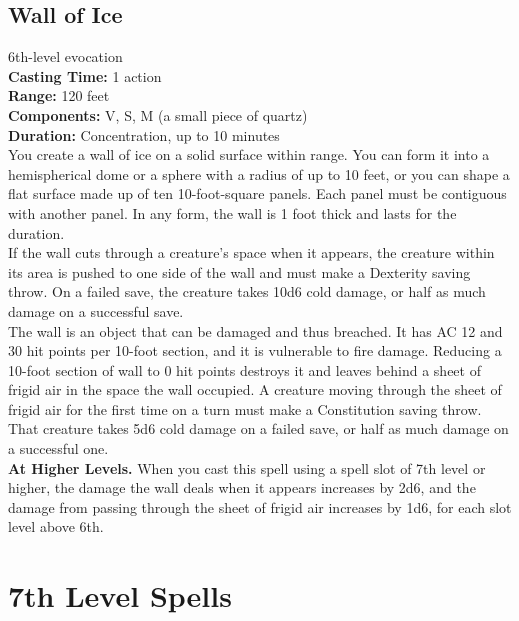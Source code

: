 \documentclass[11pt, A4paper, english]{article}
\begin{document}
		\subsection{Wall of Ice}
6th-level evocation \\
\textbf{Casting Time:} 1 action \\
\textbf{Range:} 120 feet \\
\textbf{Components:} V, S, M (a small piece of quartz) \\
\textbf{Duration:} Concentration, up to 10 minutes \\
You create a wall of ice on a solid surface within range. You can form it into a hemispherical dome or a sphere with a radius of up to 10 feet, or you can shape a flat surface made up of ten 10-foot-square panels. Each panel must be contiguous with another panel. In any form, the wall is 1 foot thick and lasts for the duration. \\
If the wall cuts through a creature’s space when it appears, the creature within its area is pushed to one side of the wall and must make a Dexterity saving throw. On a failed save, the creature takes  10d6 cold damage, or half as much damage on a successful save. \\
The wall is an object that can be damaged and thus breached. It has AC 12 and 30 hit points per 10-foot section, and it is vulnerable to fire damage. Reducing a 10-foot section of wall to 0 hit points destroys it and leaves behind a sheet of frigid air in the space the wall occupied. A creature moving through the sheet of frigid air for the first time on a turn must make a Constitution saving throw. That creature takes 5d6 cold damage on a failed save, or half as much damage on a successful one. \\
\textbf{At Higher Levels.} When you cast this spell using a spell slot of 7th level or higher, the damage the wall deals when it appears increases by 2d6, and the damage from passing through the sheet of frigid air increases by 1d6, for each slot level above 6th.



	\section{7th Level Spells}
\end{document}
